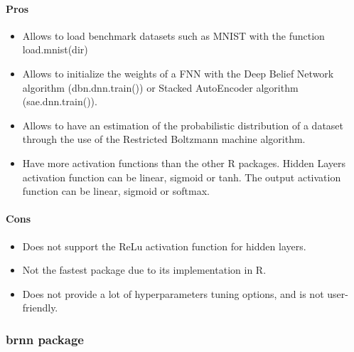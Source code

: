 \documentclass[letter,8pt]{article}\usepackage[]{graphicx}\usepackage[]{color}
\begin{document}
\paragraph{Pros}
\begin{itemize}
\item Allows to load benchmark datasets such as MNIST with the function load.mnist(dir)
\item Allows to initialize the weights of a FNN with the Deep Belief Network algorithm (dbn.dnn.train()) or Stacked AutoEncoder algorithm (sae.dnn.train()).
\item Allows to have an estimation of the probabilistic distribution of a dataset through the use of the Restricted Boltzmann machine algorithm.
\item Have more activation functions than the other R packages. Hidden Layers activation function can be linear, sigmoid or tanh. The output activation function can be linear, sigmoid or softmax.
\end{itemize}
\paragraph{Cons}
\begin{itemize}
\item Does not support the ReLu activation function for hidden layers.
\item Not the fastest package due to its implementation in R.
\item Does not provide a lot of hyperparameters tuning options, and is not user-friendly.
\end{itemize}


\subsubsection{brnn package}
\end{document}
